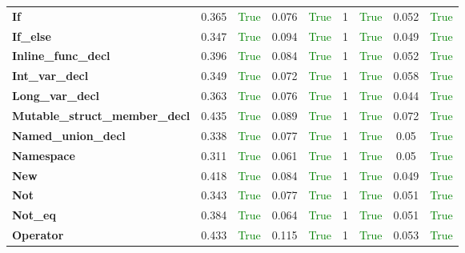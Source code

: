 \documentclass{article}
\begin{document}
\begin{xltabular}{\textwidth}{lcccccccc}
\textbf{{\fontsize{10}{12}\selectfont If}}& 0.365&\textcolor{green}{True}& 0.076&\textcolor{green}{True}& 1&\textcolor{green}{True}& 0.052&\textcolor{green}{True} \\[0.5ex]
\textbf{{\fontsize{10}{12}\selectfont If\_else}}& 0.347&\textcolor{green}{True}& 0.094&\textcolor{green}{True}& 1&\textcolor{green}{True}& 0.049&\textcolor{green}{True} \\[0.5ex]
\textbf{{\fontsize{10}{12}\selectfont Inline\_func\_decl}}& 0.396&\textcolor{green}{True}& 0.084&\textcolor{green}{True}& 1&\textcolor{green}{True}& 0.052&\textcolor{green}{True} \\[0.5ex]
\textbf{{\fontsize{10}{12}\selectfont Int\_var\_decl}}& 0.349&\textcolor{green}{True}& 0.072&\textcolor{green}{True}& 1&\textcolor{green}{True}& 0.058&\textcolor{green}{True} \\[0.5ex]
\textbf{{\fontsize{10}{12}\selectfont Long\_var\_decl}}& 0.363&\textcolor{green}{True}& 0.076&\textcolor{green}{True}& 1&\textcolor{green}{True}& 0.044&\textcolor{green}{True} \\[0.5ex]
\textbf{{\fontsize{10}{12}\selectfont Mutable\_struct\_member\_decl}}& 0.435&\textcolor{green}{True}& 0.089&\textcolor{green}{True}& 1&\textcolor{green}{True}& 0.072&\textcolor{green}{True} \\[0.5ex]
\textbf{{\fontsize{10}{12}\selectfont Named\_union\_decl}}& 0.338&\textcolor{green}{True}& 0.077&\textcolor{green}{True}& 1&\textcolor{green}{True}& 0.05&\textcolor{green}{True} \\[0.5ex]
\textbf{{\fontsize{10}{12}\selectfont Namespace}}& 0.311&\textcolor{green}{True}& 0.061&\textcolor{green}{True}& 1&\textcolor{green}{True}& 0.05&\textcolor{green}{True} \\[0.5ex]
\textbf{{\fontsize{10}{12}\selectfont New}}& 0.418&\textcolor{green}{True}& 0.084&\textcolor{green}{True}& 1&\textcolor{green}{True}& 0.049&\textcolor{green}{True} \\[0.5ex]
\textbf{{\fontsize{10}{12}\selectfont Not}}& 0.343&\textcolor{green}{True}& 0.077&\textcolor{green}{True}& 1&\textcolor{green}{True}& 0.051&\textcolor{green}{True} \\[0.5ex]
\textbf{{\fontsize{10}{12}\selectfont Not\_eq}}& 0.384&\textcolor{green}{True}& 0.064&\textcolor{green}{True}& 1&\textcolor{green}{True}& 0.051&\textcolor{green}{True} \\[0.5ex]
\textbf{{\fontsize{10}{12}\selectfont Operator}}& 0.433&\textcolor{green}{True}& 0.115&\textcolor{green}{True}& 1&\textcolor{green}{True}& 0.053&\textcolor{green}{True} \\[0.5ex]

\end{xltabular}
\end{document}

